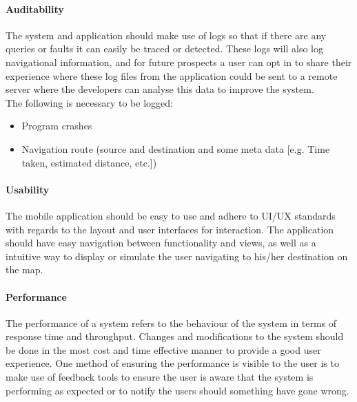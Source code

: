 \documentclass[runningheads,a4paper]{article}
\begin{document}
\paragraph{\textbf{Auditability} \\}
 The system and application should make use of logs so that if there are any queries or faults it can easily be traced or detected. These logs will also log navigational information, and for future prospects a user can opt in to share their experience where these log files from the application could be sent to a remote server where the developers can analyse this data to improve the system. \\The following is necessary to be logged:
 \begin{itemize}
 	\item Program crashes
 	\item Navigation route (source and destination and some meta data [e.g. Time taken, estimated distance, etc.])
 \end{itemize}
 

\paragraph{\textbf{Usability} \\}
 The mobile application should be easy to use and adhere to UI/UX standards with regards to the layout and user interfaces for interaction. The application should have easy navigation between functionality and views, as well as a intuitive way to display or simulate the user navigating to his/her destination on the map.
 
 
\paragraph{\textbf{Performance} \\}
The performance of a system refers to the behaviour of the system in
terms of response time and throughput. Changes and modifications to
the system should be done in the most cost and time effective manner to
provide a good user experience. One method of ensuring the performance
is visible to the user is to make use of feedback tools to ensure the user
is aware that the system is performing as expected or to notify the users
should something have gone wrong.
\end{document}
